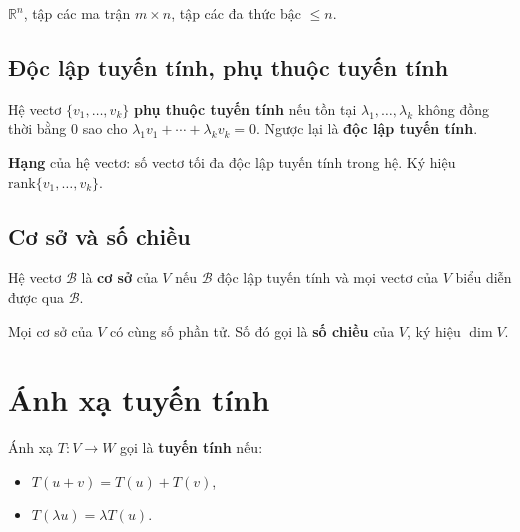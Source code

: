 \documentclass[12pt,a4paper]{article}
\begin{document}
\begin{vidu}
  $\mathbb{R}^n$, tập các ma trận $m \times n$, tập các đa thức bậc $\le n$.
\end{vidu}

\subsection{Độc lập tuyến tính, phụ thuộc tuyến tính}

\begin{dinhnghia}
  Hệ vectơ $\{v_1, \ldots, v_k\}$ \textbf{phụ thuộc tuyến tính} nếu tồn tại $\lambda_1, \ldots, \lambda_k$ không đồng thời bằng 0 sao cho $\lambda_1 v_1 + \cdots + \lambda_k v_k = 0$. Ngược lại là \textbf{độc lập tuyến tính}.
\end{dinhnghia}

\begin{dinhnghia}
  \textbf{Hạng} của hệ vectơ: số vectơ tối đa độc lập tuyến tính trong hệ. Ký hiệu $\mathrm{rank}\{v_1, \ldots, v_k\}$.
\end{dinhnghia}

\subsection{Cơ sở và số chiều}

\begin{dinhnghia}
  Hệ vectơ $\mathcal{B}$ là \textbf{cơ sở} của $V$ nếu $\mathcal{B}$ độc lập tuyến tính và mọi vectơ của $V$ biểu diễn được qua $\mathcal{B}$.
\end{dinhnghia}

\begin{dinhly}
  Mọi cơ sở của $V$ có cùng số phần tử. Số đó gọi là \textbf{số chiều} của $V$, ký hiệu $\dim V$.
\end{dinhly}

\section{Ánh xạ tuyến tính}

\begin{dinhnghia}
  Ánh xạ $T: V \to W$ gọi là \textbf{tuyến tính} nếu:
  \begin{itemize}
    \item $T(u + v) = T(u) + T(v)$,
    \item $T(\lambda u) = \lambda T(u)$.
  \end{itemize}
\end{dinhnghia}
\end{document}
